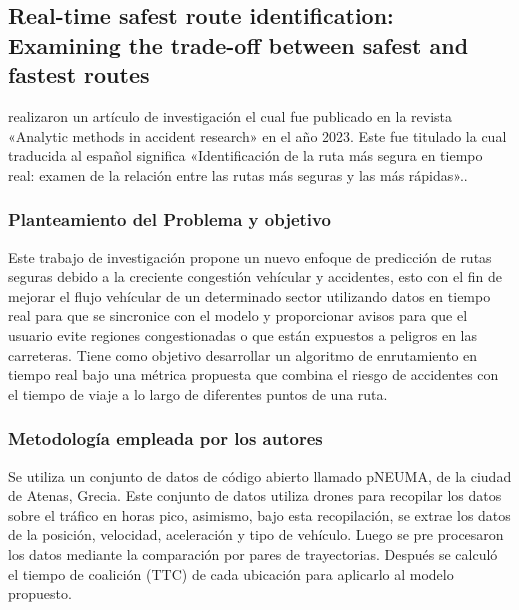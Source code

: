 \subsection{Real-time safest route identification: Examining the trade-off between safest and fastest routes \citep*{pr_dehghani2018copper}}
\citeauthor{pr_dehghani2018copper} realizaron un artículo de investigación el cual fue publicado en la revista «Analytic methods in accident research» en el año 2023. Este fue titulado  la cual traducida al español significa «Identificación de la ruta más segura en tiempo real: examen de la relación entre las rutas más seguras y las más rápidas»..

\subsubsection{Planteamiento del Problema y objetivo }
Este trabajo de investigación propone un nuevo enfoque de predicción de rutas seguras debido a la creciente congestión vehícular y accidentes, esto con el fin de mejorar el flujo vehícular  de un determinado sector utilizando datos en tiempo real para que se sincronice con el modelo y proporcionar avisos para que el usuario evite regiones congestionadas o que están expuestos a peligros en las carreteras. Tiene como objetivo desarrollar un algoritmo de enrutamiento en tiempo real bajo una métrica propuesta que combina el riesgo de accidentes con el tiempo de viaje a lo largo de diferentes puntos de una ruta.

\subsubsection{Metodología empleada por los autores}
Se utiliza un conjunto de datos de código abierto llamado pNEUMA, de la ciudad de Atenas, Grecia. Este conjunto de datos utiliza drones para recopilar los datos sobre el tráfico en horas pico, asimismo, bajo esta recopilación, se extrae los datos de la posición, velocidad, aceleración y tipo de vehículo. Luego se pre procesaron los datos mediante la comparación por pares de trayectorias. Después se calculó el tiempo de coalición (TTC) de cada ubicación para aplicarlo al modelo propuesto.

